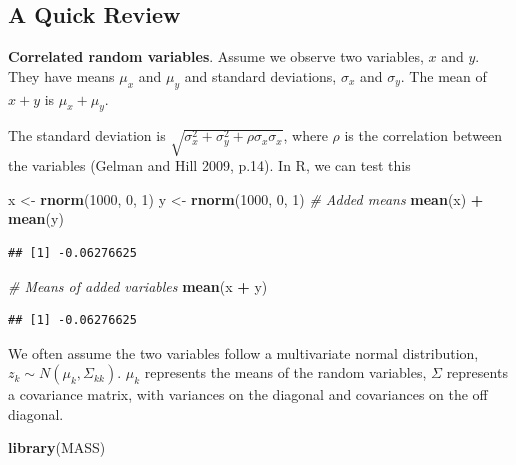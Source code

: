 \documentclass[
]{book}
\newenvironment{Shaded}{\begin{snugshade}}{\end{snugshade}}
\newcommand{\CommentTok}[1]{\textcolor[rgb]{0.56,0.35,0.01}{\textit{#1}}}
\newcommand{\DecValTok}[1]{\textcolor[rgb]{0.00,0.00,0.81}{#1}}
\newcommand{\FunctionTok}[1]{\textcolor[rgb]{0.13,0.29,0.53}{\textbf{#1}}}
\newcommand{\NormalTok}[1]{#1}
\newcommand{\OtherTok}[1]{\textcolor[rgb]{0.56,0.35,0.01}{#1}}
\newcommand{\SpecialCharTok}[1]{\textcolor[rgb]{0.81,0.36,0.00}{\textbf{#1}}}
\begin{document}
\subsection{A Quick Review}\label{a-quick-review}

\textbf{Correlated random variables}. Assume we observe two variables, \(x\) and \(y\). They have means \(\mu_x\) and \(\mu_y\) and standard deviations, \(\sigma_x\) and \(\sigma_y\). The mean of \(x+y\) is \(\mu_x+\mu_y\).

The standard deviation is \(\sqrt{\sigma^2_x+\sigma^2_y+\rho\sigma_x\sigma_x}\), where \(\rho\) is the correlation between the variables (Gelman and Hill 2009, p.14). In R, we can test this

\begin{Shaded}
\begin{Highlighting}[]
\NormalTok{x }\OtherTok{\textless{}{-}} \FunctionTok{rnorm}\NormalTok{(}\DecValTok{1000}\NormalTok{, }\DecValTok{0}\NormalTok{, }\DecValTok{1}\NormalTok{)}
\NormalTok{y }\OtherTok{\textless{}{-}} \FunctionTok{rnorm}\NormalTok{(}\DecValTok{1000}\NormalTok{, }\DecValTok{0}\NormalTok{, }\DecValTok{1}\NormalTok{)}
\CommentTok{\# Added means}
\FunctionTok{mean}\NormalTok{(x) }\SpecialCharTok{+} \FunctionTok{mean}\NormalTok{(y) }
\end{Highlighting}
\end{Shaded}

\begin{verbatim}
## [1] -0.06276625
\end{verbatim}

\begin{Shaded}
\begin{Highlighting}[]
\CommentTok{\# Means of added variables}
\FunctionTok{mean}\NormalTok{(x }\SpecialCharTok{+}\NormalTok{ y)}
\end{Highlighting}
\end{Shaded}

\begin{verbatim}
## [1] -0.06276625
\end{verbatim}

We often assume the two variables follow a multivariate normal distribution, \(z_k \sim N(\mu_k, \Sigma_{kk})\). \(\mu_k\) represents the means of the random variables, \(\Sigma\) represents a covariance matrix, with variances on the diagonal and covariances on the off diagonal.

\begin{Shaded}
\begin{Highlighting}[]
\FunctionTok{library}\NormalTok{(MASS)}
\end{Highlighting}
\end{Shaded}
\end{document}
